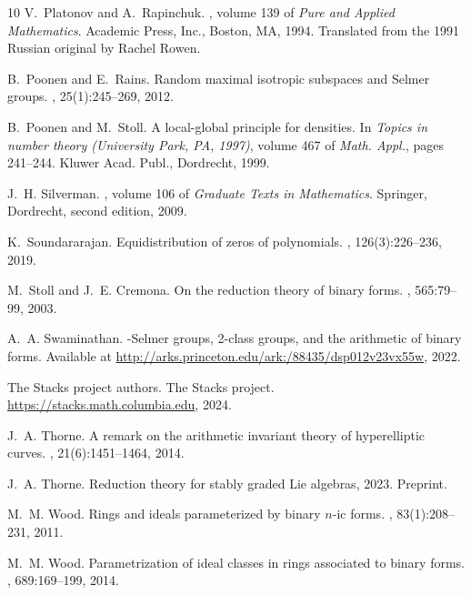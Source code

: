 \begin{thebibliography}{10}
V.~Platonov and A.~Rapinchuk.
, volume 139 of {\em Pure and
  Applied Mathematics}.
\newblock Academic Press, Inc., Boston, MA, 1994.
\newblock Translated from the 1991 Russian original by Rachel Rowen.

B.~Poonen and E.~Rains.
\newblock Random maximal isotropic subspaces and {S}elmer groups.
, 25(1):245--269, 2012.

B.~Poonen and M.~Stoll.
\newblock A local-global principle for densities.
\newblock In {\em Topics in number theory ({U}niversity {P}ark, {PA}, 1997)},
  volume 467 of {\em Math. Appl.}, pages 241--244. Kluwer Acad. Publ.,
  Dordrecht, 1999.

J.~H. Silverman.
, volume 106 of {\em Graduate
  Texts in Mathematics}.
\newblock Springer, Dordrecht, second edition, 2009.

K.~Soundararajan.
\newblock Equidistribution of zeros of polynomials.
, 126(3):226--236, 2019.

M.~Stoll and J.~E. Cremona.
\newblock On the reduction theory of binary forms.
, 565:79--99, 2003.

A.~A. Swaminathan.
-{S}elmer groups, 2-class groups, and the arithmetic of binary
  forms.
\newblock Available at
  \url{http://arks.princeton.edu/ark:/88435/dsp012v23vx55w}, 2022.

{The Stacks project authors}.
\newblock The {S}tacks project.
\newblock \url{https://stacks.math.columbia.edu}, 2024.

J.~A. Thorne.
\newblock A remark on the arithmetic invariant theory of hyperelliptic curves.
, 21(6):1451--1464, 2014.

J.~A. Thorne.
\newblock Reduction theory for stably graded {L}ie algebras, 2023.
\newblock Preprint.

M.~M. Wood.
\newblock Rings and ideals parameterized by binary {$n$}-ic forms.
, 83(1):208--231, 2011.

M.~M. Wood.
\newblock Parametrization of ideal classes in rings associated to binary forms.
, 689:169--199, 2014.

\end{thebibliography}
